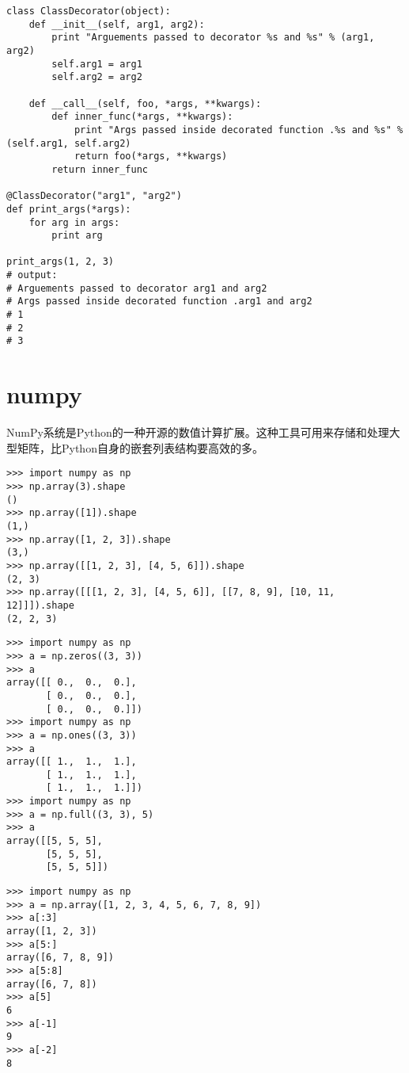 \begin{verbatim}
class ClassDecorator(object):
    def __init__(self, arg1, arg2):
        print "Arguements passed to decorator %s and %s" % (arg1, arg2)
        self.arg1 = arg1
        self.arg2 = arg2

    def __call__(self, foo, *args, **kwargs):
        def inner_func(*args, **kwargs):
            print "Args passed inside decorated function .%s and %s" % (self.arg1, self.arg2)
            return foo(*args, **kwargs)
        return inner_func

@ClassDecorator("arg1", "arg2")
def print_args(*args):
    for arg in args:
        print arg

print_args(1, 2, 3)
# output:
# Arguements passed to decorator arg1 and arg2
# Args passed inside decorated function .arg1 and arg2
# 1
# 2
# 3
\end{verbatim}

\section{numpy}
NumPy系统是Python的一种开源的数值计算扩展。这种工具可用来存储和处理大型矩阵，比Python自身的嵌套列表结构要高效的多。

\begin{verbatim}
>>> import numpy as np
>>> np.array(3).shape
()
>>> np.array([1]).shape
(1,)
>>> np.array([1, 2, 3]).shape
(3,)
>>> np.array([[1, 2, 3], [4, 5, 6]]).shape
(2, 3)
>>> np.array([[[1, 2, 3], [4, 5, 6]], [[7, 8, 9], [10, 11, 12]]]).shape
(2, 2, 3)
\end{verbatim}

\begin{verbatim}
>>> import numpy as np
>>> a = np.zeros((3, 3))
>>> a
array([[ 0.,  0.,  0.],
       [ 0.,  0.,  0.],
       [ 0.,  0.,  0.]])
>>> import numpy as np
>>> a = np.ones((3, 3))
>>> a
array([[ 1.,  1.,  1.],
       [ 1.,  1.,  1.],
       [ 1.,  1.,  1.]])
>>> import numpy as np
>>> a = np.full((3, 3), 5)
>>> a
array([[5, 5, 5],
       [5, 5, 5],
       [5, 5, 5]])
\end{verbatim}


\begin{verbatim}
>>> import numpy as np
>>> a = np.array([1, 2, 3, 4, 5, 6, 7, 8, 9])
>>> a[:3]
array([1, 2, 3])
>>> a[5:]
array([6, 7, 8, 9])
>>> a[5:8]
array([6, 7, 8])
>>> a[5]
6
>>> a[-1]
9
>>> a[-2]
8
\end{verbatim}


